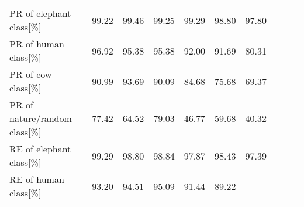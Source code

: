 \begin{table}[ht]
{\begin{tabular}{lrrrrrrrrr}
        PR of elephant class[\%]        & \cellcolor{tbyellow}99.22     
                                        & \cellcolor{tbgreen}99.46   
                                        & \cellcolor{tbyellow}99.25   
                                        & \cellcolor{tbgreeny}99.29  
                                        & \cellcolor{tbyellow}98.80  
                                        & \cellcolor{tbred}97.80\\
        PR of human class[\%]           & \cellcolor{tbgreen}96.92     
                                        & \cellcolor{tbgreeny}95.38   
                                        & \cellcolor{tbgreeny}95.38   
                                        & \cellcolor{tbyellow}92.00  
                                        & \cellcolor{tbyellow}91.69  
                                        & \cellcolor{tbred}80.31\\
        PR of cow class[\%]             & \cellcolor{tbgreeny}90.99     
                                        & \cellcolor{tbgreen}93.69   
                                        & \cellcolor{tbyellow}90.09   
                                        & \cellcolor{tbyellow}84.68  
                                        & \cellcolor{tbyellow}75.68  
                                        & \cellcolor{tbred}69.37\\
        PR of nature/random class[\%]   & \cellcolor{tbgreeny}77.42     
                                        & \cellcolor{tbyellow}64.52   
                                        & \cellcolor{tbgreen}79.03   
                                        & \cellcolor{tbyellow}46.77  
                                        & \cellcolor{tbyellow}59.68 
                                        & \cellcolor{tbred}40.32\\\midrule
        RE of elephant class[\%]        & \cellcolor{tbgreen}99.29     
                                        & \cellcolor{tbyellow}98.80   
                                        & \cellcolor{tbgreeny}98.84   
                                        & \cellcolor{tbyellow}97.87  
                                        & \cellcolor{tbyellow}98.43  
                                        & \cellcolor{tbred}97.39\\
        RE of human class[\%]           & \cellcolor{tbyellow}93.20     
                                        & \cellcolor{tbgreeny}94.51   
                                        & \cellcolor{tbgreen}95.09   
                                        & \cellcolor{tbyellow}91.44  
                                        & \cellcolor{tbyellow}89.22  

\end{tabular}}
\end{table}
